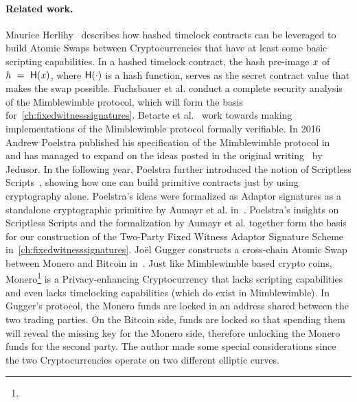 \paragraph{Related work.} Maurice Herlihy~\cite{herlihy2018atomic} describes how hashed timelock contracts can be leveraged to build Atomic Swaps between Cryptocurrencies that have at least some basic scripting capabilities.
In a hashed timelock contract, the hash pre-image $\mathit{x}$ of $\mathit{h} ~=~ \mathsf{H} (\mathit{x})$, where $\mathsf{H} (\cdot)$ is a hash function, serves as the secret contract value that makes the swap possible.
Fuchsbauer et al. conduct a complete security analysis of the Mimblewimble protocol, which will form the basis for~\cref{ch:fixedwitnesssignatures}.
Betarte et al.~\cite{betarte2019towards} work towards making implementations of the Mimblewimble protocol formally verifiable.
In 2016 Andrew Poelstra published his specification of the Mimblewimble protocol in~\cite{poelstra2016mimblewimble} and has managed to expand on the ideas posted in the original writing~\cite{jedusor2016mimblewimble} by Jedusor.
In the following year, Poelstra further introduced the notion of Scriptless Scripts~\cite{poelstra2017scriptless}, showing how one can build primitive contracts just by using cryptography alone.
Poelstra's ideas were formalized as Adaptor signatures as a standalone cryptographic primitive by Aumayr et al. in~\cite{aumayr2020bitcoinchannels}.
Poelstra's insights on Scriptless Scripts and the formalization by Aumayr et al. together form the basis for our construction of the Two-Party Fixed Witness Adaptor Signature Scheme in~\cref{ch:fixedwitnesssignatures}.
Joël Gugger constructs a cross-chain Atomic Swap between Monero and Bitcoin in~\cite{gugger2020bitcoin}.
Just like Mimblewimble based crypto coins, Monero\footnote{\urlmonero} is a Privacy-enhancing Cryptocurrency that lacks scripting capabilities and even lacks timelocking capabilities (which do exist in Mimblewimble).
In Gugger's protocol, the Monero funds are locked in an address shared between the two trading parties.
On the Bitcoin side, funds are locked so that spending them will reveal the missing key for the Monero side, therefore unlocking the Monero funds for the second party.
The author made some special considerations since the two Cryptocurrencies operate on two different elliptic curves.



